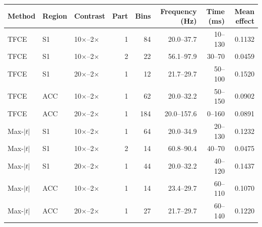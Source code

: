 \begin{tabular}{lllrrrrr}
\toprule
Method & Region & Contrast & Part & Bins & Frequency (Hz) & Time (ms) & Mean effect \\
\midrule
TFCE & S1 & 10$\times$--2$\times$ & 1 & 84 & 20.0--37.7 & 10--130 & 0.1132 \\
TFCE & S1 & 10$\times$--2$\times$ & 2 & 22 & 56.1--97.9 & 30--70 & 0.0459 \\
TFCE & S1 & 20$\times$--2$\times$ & 1 & 12 & 21.7--29.7 & 50--100 & 0.1520 \\
TFCE & ACC & 10$\times$--2$\times$ & 1 & 62 & 20.0--32.2 & 50--150 & 0.0902 \\
TFCE & ACC & 20$\times$--2$\times$ & 1 & 184 & 20.0--157.6 & 0--160 & 0.0891 \\
Max-$|t|$ & S1 & 10$\times$--2$\times$ & 1 & 64 & 20.0--34.9 & 20--130 & 0.1232 \\
Max-$|t|$ & S1 & 10$\times$--2$\times$ & 2 & 14 & 60.8--90.4 & 40--70 & 0.0475 \\
Max-$|t|$ & S1 & 20$\times$--2$\times$ & 1 & 44 & 20.0--32.2 & 40--120 & 0.1437 \\
Max-$|t|$ & ACC & 10$\times$--2$\times$ & 1 & 14 & 23.4--29.7 & 60--110 & 0.1070 \\
Max-$|t|$ & ACC & 20$\times$--2$\times$ & 1 & 27 & 21.7--29.7 & 60--140 & 0.1220 \\
\bottomrule
\end{tabular}
